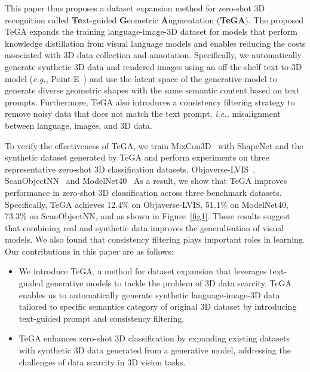 This paper thus proposes a dataset expansion method for zero-shot 3D recognition called \textbf{Te}xt-guided \textbf{G}eometric \textbf{A}ugmentation (\textbf{TeGA}). 
The proposed TeGA expands the training language-image-3D dataset for models that perform knowledge distillation from visual language models and enables reducing the costs associated with 3D data collection and annotation.
Specifically, we automatically generate synthetic 3D data and rendered images using an off-the-shelf text-to-3D model (\textit{e.g.,} Point-E~\cite{nichol2022point}) and use the latent space of the generative model to generate diverse geometric shapes with the same semantic content based on text prompts. 
Furthermore, TeGA also introduces a consistency filtering strategy to remove noisy data that does not match the text prompt, \textit{i.e.,} misalignment between language, images, and 3D data. 

To verify the effectiveness of TeGA, we train MixCon3D~\cite{gao2024sculpting} with ShapeNet and the synthetic dataset generated by TeGA and perform experiments on three representative zero-shot 3D classification datasets, Objaverse-LVIS~\cite{deitke2023objaverse}, ScanObjectNN~\cite{uy2019revisiting} and ModelNet40~\cite{wu20153d}
As a result, we show that TeGA improves performance in zero-shot 3D classification across three benchmark datasets. Specifically, TeGA achieves 12.4\% on Objaverse-LVIS, 51.1\% on ModelNet40, 73.3\% on ScanObjectNN, and  as shown in Figure~\ref{fig1}.
These results suggest that combining real and synthetic data improves the generalisation of visual models. We also found that consistency filtering plays important roles in learning. Our contributions in this paper are as follows:

\begin{itemize}
    \item We introduce TeGA, a method for dataset expansion that leverages text-guided generative models to tackle the problem of 3D data scarcity. TeGA enables us to automatically generate synthetic language-image-3D data tailored to specific semantics category of original 3D dataset by introducing text-guided prompt and consistency filtering.
    \item TeGA enhances zero-shot 3D classification by expanding existing datasets with synthetic 3D data generated from a generative model, addressing the challenges of data scarcity in 3D vision tasks.
\end{itemize}

